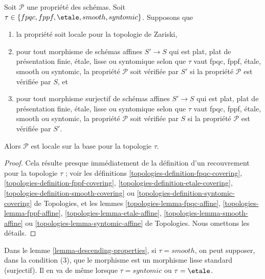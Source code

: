 \begin{lemma}
\label{lemma-descending-properties}
Soit $\mathcal{P}$ une propriété des schémas.
Soit $\tau \in \{fpqc, \linebreak[0] fppf, \linebreak[0]
\etale, \linebreak[0] smooth, \linebreak[0] syntomic\}$. Supposons que
\begin{enumerate}
\item la propriété soit locale pour la topologie de Zariski,
\item pour tout morphisme de schémas affines $S' \to S$ qui est plat,
plat de présentation finie, \'etale, lisse ou syntomique selon que $\tau$
vaut fpqc, fppf, \'etale, smooth ou syntomic, la propriété $\mathcal{P}$
soit vérifiée par $S'$ si la propriété $\mathcal{P}$ est vérifiée par $S$, et
\item pour tout morphisme surjectif de schémas affines $S' \to S$ qui est
plat, plat de présentation finie, \'etale, lisse ou syntomique selon que
$\tau$ vaut fpqc, fppf, \'etale, smooth ou syntomic, la propriété
$\mathcal{P}$ soit vérifiée par $S$ si la propriété $\mathcal{P}$ est
vérifiée par $S'$.
\end{enumerate}
Alors $\mathcal{P}$ est locale sur la base pour la topologie $\tau$.
\end{lemma}

\begin{proof}
Cela résulte presque immédiatement de la définition d'un recouvrement pour
la topologie $\tau$ ; voir les définitions
\ref{topologies-definition-fpqc-covering},
\ref{topologies-definition-fppf-covering},
\ref{topologies-definition-etale-covering},
\ref{topologies-definition-smooth-covering} ou
\ref{topologies-definition-syntomic-covering} de Topologies, et les lemmes
\ref{topologies-lemma-fpqc-affine},
\ref{topologies-lemma-fppf-affine},
\ref{topologies-lemma-etale-affine},
\ref{topologies-lemma-smooth-affine} ou
\ref{topologies-lemma-syntomic-affine} de Topologies. Nous omettons les détails.
\end{proof}

\begin{remark}
\label{remark-descending-properties-standard}
Dans le lemme \ref{lemma-descending-properties}, si $\tau = smooth$, on
peut supposer, dans la condition (3), que le morphisme est un morphisme
lisse standard (surjectif). Il en va de même lorsque $\tau = syntomic$ ou
$\tau = \etale$.
\end{remark}






